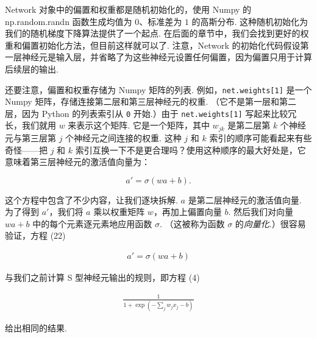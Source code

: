 Network 对象中的偏置和权重都是随机初始化\label{term:39}的，使用 Numpy 的 np.random.randn 函数生成均值为 $0$、标准差\label{term:40}为 $1$ 的高斯分布. 这种随机初始化为我们的随机梯度下降算法提供了一个起点. 在后面的章节中，我们会找到更好的权重和偏置初始化方法，但目前这样就可以了. 注意，Network 的初始化代码假设第一层神经元是输入层，并省略了为这些神经元设置任何偏置，因为偏置只用于计算后续层的输出.

还要注意，偏置和权重存储为 Numpy 矩阵的列表. 例如，\texttt{net.weights[1]} 是一个 Numpy 矩阵，存储连接第二层和第三层神经元的权重. （它不是第一层和第二层，因为 Python 的列表索引从 \texttt{0} 开始.）由于 \texttt{net.weights[1]} 写起来比较冗长，我们就用 $w$ 来表示这个矩阵\label{term:41}. 它是一个矩阵，其中 $w_{jk}$ 是第二层第 $k$ 个神经元与第三层第 $j$ 个神经元之间连接的权重. 这种 $j$ 和 $k$ 索引的顺序可能看起来有些奇怪——把 $j$ 和 $k$ 索引互换一下不是更合理吗？使用这种顺序的最大好处是，它意味着第三层神经元的激活值向量为：

\begin{equation}
a' = \sigma(w a + b).
\tag{22}
\end{equation}

\noindent 这个方程中包含了不少内容，让我们逐块拆解. $a$ 是第二层神经元的激活值向量. 为了得到 $a'$，我们将 $a$ 乘以权重矩阵 $w$，再加上偏置向量 $b$. 然后我们对向量 $w a + b$ 中的每个元素逐元素地应用函数 $\sigma$. （这被称为函数 $\sigma$ 的\emph{向量化}.）很容易验证，方程 (22)

\begin{align*}
a' = \sigma(w a + b) \nonumber
\end{align*}

\noindent 与我们之前计算 S 型神经元输出的规则，即方程 (4)

\begin{align*}
\frac{1}{1+\exp(-\sum_j w_j x_j-b)} \nonumber
\end{align*}

\noindent 给出相同的结果.

